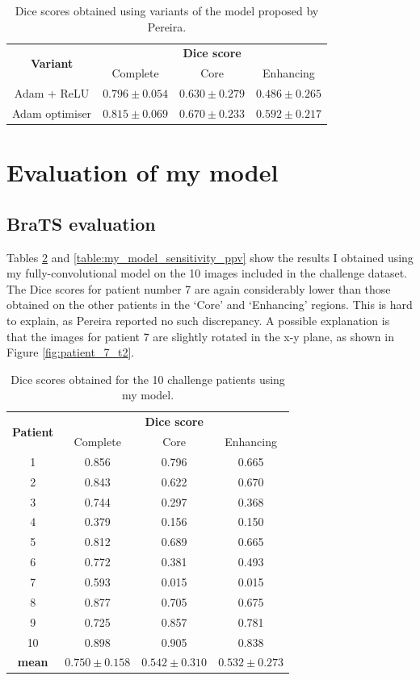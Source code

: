 \documentclass[12pt,a4paper,twoside,openright]{report}
\begin{document}
\begin{table}
\centering	
\begin{tabular}{ c | c c c} 
\multirow{2}{*}{\textbf{Variant}} & \multicolumn{3}{c}{\textbf{Dice score}} \\
 & Complete & Core & Enhancing \\
 \hline
Adam + ReLU & $0.796 \pm 0.054$ & $0.630 \pm 0.279$ & $0.486 \pm 0.265$ \\
Adam optimiser & $0.815 \pm 0.069$ & $0.670 \pm 0.233$ & $0.592 \pm 0.217$ \\
\end{tabular}
\caption{Dice scores obtained using variants of the model proposed by Pereira.}
\label{table:variants_dice_results}
\end{table}


\section{Evaluation of my model}
\subsection{BraTS evaluation}
Tables \ref{table:my_model_dice_results} and \ref{table:my_model_sensitivity_ppv} show the results I obtained using my fully-convolutional model on the 10 images included in the challenge dataset. The Dice scores for patient number 7 are again considerably lower than those obtained on the other patients in the `Core' and `Enhancing' regions. This is hard to explain, as Pereira reported no such discrepancy. A possible explanation is that the images for patient 7 are slightly rotated in the x-y plane, as shown in Figure \ref{fig:patient_7_t2}.

\begin{table}
\centering	
\begin{tabular}{ c | c c c} 
\multirow{2}{*}{\textbf{Patient}} & \multicolumn{3}{c}{\textbf{Dice score}} \\
 & Complete & Core & Enhancing \\
 \hline
1 & 0.856 & 0.796 & 0.665 \\
2 & 0.843 & 0.622 & 0.670 \\
3 & 0.744 & 0.297 & 0.368 \\
4 & 0.379 & 0.156 & 0.150 \\
5 & 0.812 & 0.689 & 0.665 \\
6 & 0.772 & 0.381 & 0.493 \\
7 & 0.593 & 0.015 & 0.015 \\
8 & 0.877 & 0.705 & 0.675 \\
9 & 0.725 & 0.857 & 0.781 \\
10 & 0.898 & 0.905 & 0.838 \\
\textbf{mean} & $0.750 \pm 0.158$ & $0.542 \pm 0.310$ & $0.532 \pm 0.273$
\end{tabular}
\caption{Dice scores obtained for the 10 challenge patients using my model.}
\label{table:my_model_dice_results}
\end{table}
\end{document}
